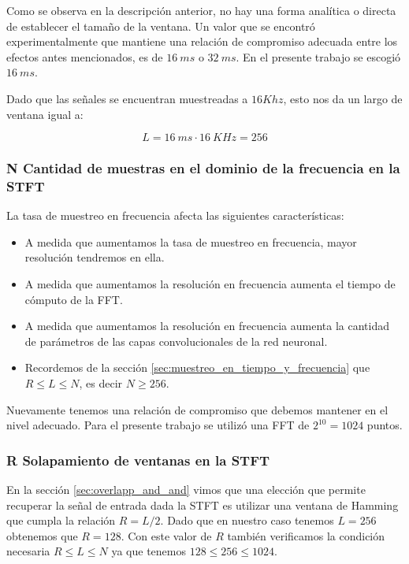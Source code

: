 Como se observa en la descripción anterior, no hay una forma analítica o directa de establecer el tamaño de la ventana. Un valor que se encontró experimentalmente que mantiene una relación de compromiso adecuada entre los efectos antes mencionados, es de $\SI{16}{ms}$ o $\SI{32}{ms}$. En el presente trabajo se escogió $\SI{16}{ms}$.

Dado que las señales se encuentran muestreadas a $16 Khz$, esto nos da un largo de ventana igual a:

\begin{equation*}
	L = \SI{16}{ms} \cdot \SI{16}{KHz} = 256
\end{equation*}

\subsubsection{N Cantidad de muestras en el dominio de la frecuencia en la STFT}
\label{sec:cantidad_muestras_frecuencia}

La tasa de muestreo en frecuencia afecta las siguientes características:

\begin{itemize}
	\item A medida que aumentamos la tasa de muestreo en frecuencia, mayor resolución tendremos en ella.
	\item A medida que aumentamos la resolución en frecuencia aumenta el tiempo de cómputo de la FFT.
	\item A medida que aumentamos la resolución en frecuencia aumenta la cantidad de parámetros de las capas convolucionales de la red neuronal.
	\item Recordemos de la sección \ref{sec:muestreo_en_tiempo_y_frecuencia} que $R \leq L \leq N$, es decir $N \ge 256$.
\end{itemize}

Nuevamente tenemos una relación de compromiso que debemos mantener en el nivel adecuado. Para el presente trabajo se utilizó una FFT de $2^{10} = 1024$ puntos. 

\subsubsection{R Solapamiento de ventanas en la STFT}

En la sección \ref{sec:overlapp_and_and} vimos que una elección que permite recuperar la señal de entrada dada la STFT es utilizar una ventana de Hamming que cumpla la relación $R = L/2$. Dado que en nuestro caso tenemos $L = 256$ obtenemos que $R=128$. Con este valor de $R$ también verificamos la condición necesaria $R \leq L \leq N$ ya que tenemos $128 \leq 256 \leq 1024$.


